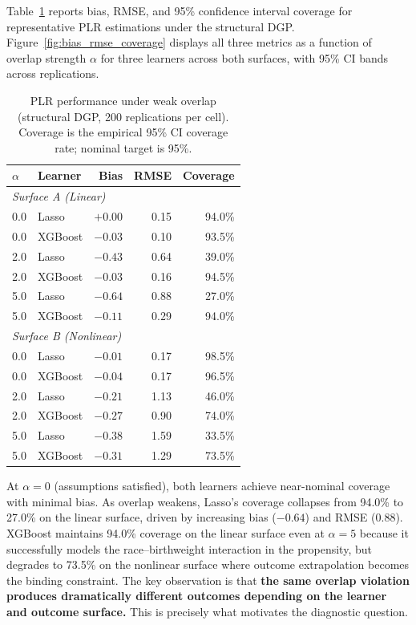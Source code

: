 \documentclass[12pt]{article}
\begin{document}
Table~\ref{tab:plr_performance} reports bias, RMSE, and 95\% confidence interval coverage for representative PLR estimations under the structural DGP. Figure~\ref{fig:bias_rmse_coverage} displays all three metrics as a function of overlap strength $\alpha$ for three learners across both surfaces, with 95\% CI bands across replications.

\begin{table}[h!]
\centering
\caption{PLR performance under weak overlap (structural DGP, 200 replications per cell). Coverage is the empirical 95\% CI coverage rate; nominal target is 95\%.}
\label{tab:plr_performance}
\begin{tabular}{llrrr}
\toprule
$\alpha$ & Learner & Bias & RMSE & Coverage \\
\midrule
\multicolumn{5}{l}{\textit{Surface A (Linear)}} \\[2pt]
0.0 & Lasso   & $+0.00$ & 0.15 & 94.0\% \\
0.0 & XGBoost & $-0.03$ & 0.10 & 93.5\% \\
2.0 & Lasso   & $-0.43$ & 0.64 & 39.0\% \\
2.0 & XGBoost & $-0.03$ & 0.16 & 94.5\% \\
5.0 & Lasso   & $-0.64$ & 0.88 & 27.0\% \\
5.0 & XGBoost & $-0.11$ & 0.29 & 94.0\% \\
\midrule
\multicolumn{5}{l}{\textit{Surface B (Nonlinear)}} \\[2pt]
0.0 & Lasso   & $-0.01$ & 0.17 & 98.5\% \\
0.0 & XGBoost & $-0.04$ & 0.17 & 96.5\% \\
2.0 & Lasso   & $-0.21$ & 1.13 & 46.0\% \\
2.0 & XGBoost & $-0.27$ & 0.90 & 74.0\% \\
5.0 & Lasso   & $-0.38$ & 1.59 & 33.5\% \\
5.0 & XGBoost & $-0.31$ & 1.29 & 73.5\% \\
\bottomrule
\end{tabular}
\end{table}

At $\alpha = 0$ (assumptions satisfied), both learners achieve near-nominal coverage with minimal bias. As overlap weakens, Lasso's coverage collapses from 94.0\% to 27.0\% on the linear surface, driven by increasing bias ($-0.64$) and RMSE ($0.88$). XGBoost maintains 94.0\% coverage on the linear surface even at $\alpha = 5$ because it successfully models the race--birthweight interaction in the propensity, but degrades to 73.5\% on the nonlinear surface where outcome extrapolation becomes the binding constraint. The key observation is that \textbf{the same overlap violation produces dramatically different outcomes depending on the learner and outcome surface.} This is precisely what motivates the diagnostic question.
\end{document}
